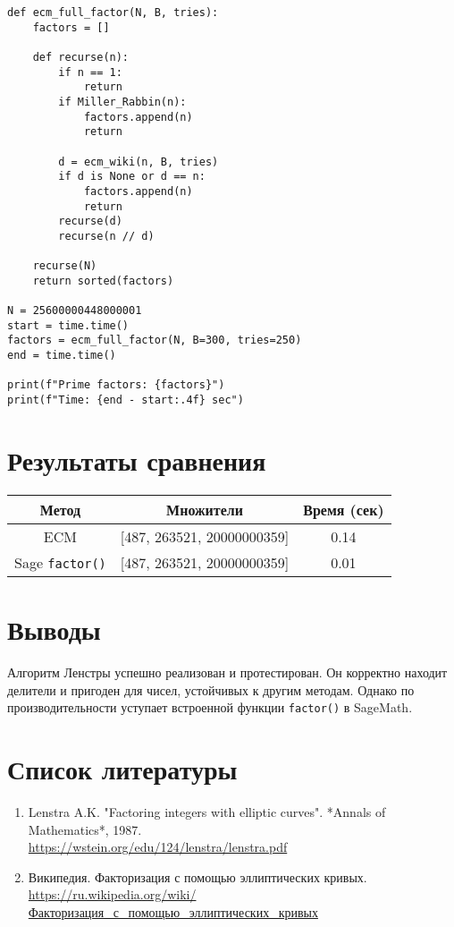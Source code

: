 \documentclass[12pt,a4paper]{article}
\begin{document}
\begin{lstlisting}
def ecm_full_factor(N, B, tries):
    factors = []

    def recurse(n):
        if n == 1:
            return
        if Miller_Rabbin(n):
            factors.append(n)
            return

        d = ecm_wiki(n, B, tries)
        if d is None or d == n:
            factors.append(n)
            return
        recurse(d)
        recurse(n // d)

    recurse(N)
    return sorted(factors)

N = 25600000448000001
start = time.time()
factors = ecm_full_factor(N, B=300, tries=250)
end = time.time()

print(f"Prime factors: {factors}")
print(f"Time: {end - start:.4f} sec")
\end{lstlisting}

\section*{Результаты сравнения}
\begin{tabular}{|c|c|c|}
\hline
Метод & Множители & Время (сек) \\
\hline
ECM & [487, 263521, 20000000359] & 0.14 \\
\hline
Sage \texttt{factor()} & [487, 263521, 20000000359] & 0.01 \\
\hline
\end{tabular}

\section*{Выводы}
Алгоритм Ленстры успешно реализован и протестирован. Он корректно находит делители и пригоден для чисел, устойчивых к другим методам. Однако по производительности уступает встроенной функции \texttt{factor()} в SageMath.

\newpage

\section*{Список литературы}

\begin{enumerate}
    \item Lenstra A.K. "Factoring integers with elliptic curves". *Annals of Mathematics*, 1987.\\
    \url{https://wstein.org/edu/124/lenstra/lenstra.pdf}
    \item Википедия. Факторизация с помощью эллиптических кривых.\\
    \url{https://ru.wikipedia.org/wiki/Факторизация_с_помощью_эллиптических_кривых}
\end{enumerate}
\end{document}
